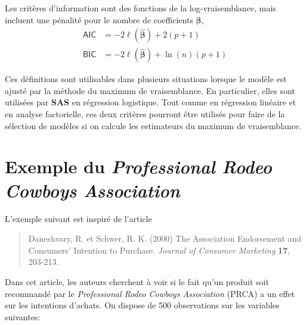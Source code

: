 \documentclass[
  11pt,
  letterpaper,
]{book}
\theoremstyle{definition}
\theoremstyle{definition}
\theoremstyle{definition}
\theoremstyle{definition}
\theoremstyle{remark}
\begin{document}
Les critères d'information sont des fonctions de la log-vraisemblance, mais incluent une pénalité pour le nombre de coefficients \(\boldsymbol{\beta}\),
\begin{align*}
 \mathsf{AIC} & = -2 \ell(\widehat{\boldsymbol{\beta}}) + 2(p+1)\\
 \mathsf{BIC} & = -2 \ell(\widehat{\boldsymbol{\beta}}) + \ln(n)(p+1)
\end{align*}

Ces définitions sont utilisables dans plusieurs situations lorsque le modèle est ajusté par la méthode du maximum de vraisemblance. En particulier, elles sont utilisées par \textbf{SAS} en régression logistique. Tout comme en régression linéaire et en analyse factorielle, ces deux critères pourront être utilisés pour faire de la sélection de modèles si on calcule les estimateurs du maximum de vraisemblance.

\hypertarget{cowboy}{%
\section{\texorpdfstring{Exemple du \emph{Professional Rodeo Cowboys Association}}{Exemple du Professional Rodeo Cowboys Association}}\label{cowboy}}

L'exemple suivant est inspiré de l'article

\begin{quote}
Daneshvary, R. et Schwer, R. K. (2000) The Association Endorsement and Consumers' Intention to Purchase. \emph{Journal of Consumer Marketing} \textbf{17}, 203-213.
\end{quote}

Dans cet article, les auteurs cherchent à voir si le fait qu'un produit soit recommandé par le \emph{Professional Rodeo Cowboys Association} (PRCA) a un effet sur les intentions d'achats. On dispose de 500 observations sur les variables suivantes:
\end{document}
